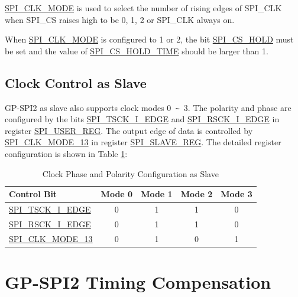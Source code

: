 \documentclass[main\_\_EN.tex]{subfiles}
\begin{document}
\hyperref[fielddesc:SPICLKMODE]{SPI\_CLK\_MODE} is used to select the number of rising edges of SPI\_CLK when SPI\_CS raises high to be 0, 1, 2 or SPI\_CLK always on.

\begin{tiplisting}
When \hyperref[fielddesc:SPICLKMODE]{SPI\_CLK\_MODE} is configured to 1 or 2, the bit \hyperref[fielddesc:SPICSHOLD]{SPI\_CS\_HOLD} must be set and the value of \hyperref[fielddesc:SPICSHOLDTIME]{SPI\_CS\_HOLD\_TIME} should be larger than 1.
\end{tiplisting}
\vspace{-1em}

\subsection{Clock Control as Slave}\label{sec:spi-slave-clock-control}

GP-SPI2 as slave also supports clock modes 0\verb+ ~ +3. The polarity and phase are configured by the bits \hyperref[fielddesc:SPITSCKIEDGE]{SPI\_TSCK\_I\_EDGE} and \hyperref[fielddesc:SPIRSCKIEDGE]{SPI\_RSCK\_I\_EDGE} in register \hyperref[regdesc:SPIUSERREG]{SPI\_USER\_REG}. The output edge of data is controlled by \hyperref[fielddesc:SPICLKMODE13]{SPI\_CLK\_MODE\_13} in register \hyperref[regdesc:SPISLAVEREG]{SPI\_SLAVE\_REG}. The detailed register configuration is shown in Table \ref{tab:spi-clk-phase-polarity-config-slave}:

\begin{table}[H]
    \centering
    \caption{Clock Phase and Polarity Configuration as Slave}
    \label{tab:spi-clk-phase-polarity-config-slave}
    \begin{tabular}[c]{|p{3.5cm}|c|c|c|c|}
    \hline
    \rowcolor{lightgray}
    \textbf{Control Bit} & \textbf{Mode 0} & \textbf{Mode 1} & \textbf{Mode 2} & \textbf{Mode 3}\\
    \hline
    \hyperref[fielddesc:SPITSCKIEDGE]{SPI\_TSCK\_I\_EDGE}   & 0 & 1 & 1 & 0\\
    \hline
    \hyperref[fielddesc:SPIRSCKIEDGE]{SPI\_RSCK\_I\_EDGE}   & 0 & 1 & 1 & 0\\
    \hline
    \hyperref[fielddesc:SPICLKMODE13]{SPI\_CLK\_MODE\_13}     & 0 & 1 & 0 & 1\\
    \hline
    \end{tabular}
\end{table}



\section{GP-SPI2 Timing Compensation} \label{sec:gp-spi-timing-compensation}
\end{document}
